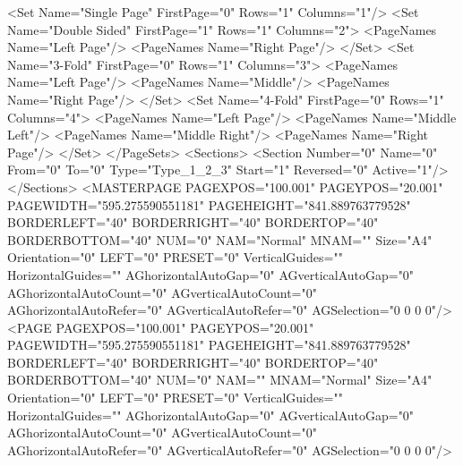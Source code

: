             <Set Name="Single Page" FirstPage="0" Rows="1" Columns="1"/>
            <Set Name="Double Sided" FirstPage="1" Rows="1" Columns="2">
                <PageNames Name="Left Page"/>
                <PageNames Name="Right Page"/>
            </Set>
            <Set Name="3-Fold" FirstPage="0" Rows="1" Columns="3">
                <PageNames Name="Left Page"/>
                <PageNames Name="Middle"/>
                <PageNames Name="Right Page"/>
            </Set>
            <Set Name="4-Fold" FirstPage="0" Rows="1" Columns="4">
                <PageNames Name="Left Page"/>
                <PageNames Name="Middle Left"/>
                <PageNames Name="Middle Right"/>
                <PageNames Name="Right Page"/>
            </Set>
        </PageSets>
        <Sections>
            <Section Number="0" Name="0" From="0" To="0" Type="Type_1_2_3" Start="1" Reversed="0" Active="1"/>
        </Sections>
        <MASTERPAGE PAGEXPOS="100.001" PAGEYPOS="20.001" PAGEWIDTH="595.275590551181" PAGEHEIGHT="841.889763779528" BORDERLEFT="40" BORDERRIGHT="40" BORDERTOP="40" BORDERBOTTOM="40" NUM="0" NAM="Normal" MNAM="" Size="A4" Orientation="0" LEFT="0" PRESET="0" VerticalGuides="" HorizontalGuides="" AGhorizontalAutoGap="0" AGverticalAutoGap="0" AGhorizontalAutoCount="0" AGverticalAutoCount="0" AGhorizontalAutoRefer="0" AGverticalAutoRefer="0" AGSelection="0 0 0 0"/>
        <PAGE PAGEXPOS="100.001" PAGEYPOS="20.001" PAGEWIDTH="595.275590551181" PAGEHEIGHT="841.889763779528" BORDERLEFT="40" BORDERRIGHT="40" BORDERTOP="40" BORDERBOTTOM="40" NUM="0" NAM="" MNAM="Normal" Size="A4" Orientation="0" LEFT="0" PRESET="0" VerticalGuides="" HorizontalGuides="" AGhorizontalAutoGap="0" AGverticalAutoGap="0" AGhorizontalAutoCount="0" AGverticalAutoCount="0" AGhorizontalAutoRefer="0" AGverticalAutoRefer="0" AGSelection="0 0 0 0"/>
